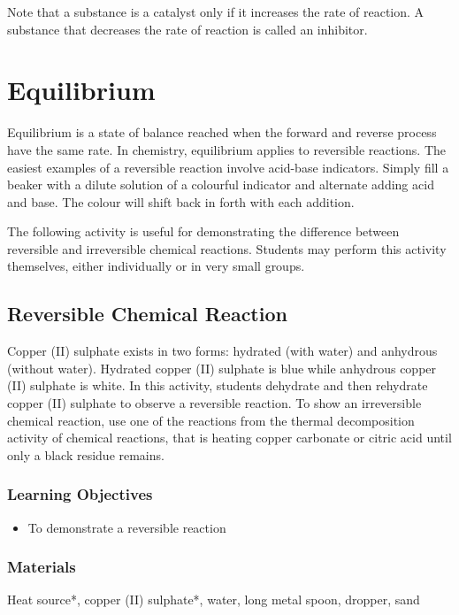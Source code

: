 Note that a substance is a catalyst only if it increases the rate of reaction. A substance that decreases the rate of reaction is called an inhibitor.

\section{Equilibrium}

Equilibrium is a state of balance reached when the forward and reverse process have the same rate. In chemistry, equilibrium applies to reversible reactions. The easiest examples of a reversible reaction involve acid-base indicators. Simply fill a beaker with a dilute solution of a colourful indicator and alternate adding acid and base. The colour will shift back in forth with each addition.

The following activity is useful for demonstrating the difference between reversible and irreversible chemical reactions. Students may perform this activity themselves, either individually or in very small groups.

\subsection{Reversible Chemical Reaction}

Copper (II) sulphate exists in two forms: hydrated (with water) and anhydrous (without water). Hydrated copper (II) sulphate is blue while anhydrous copper (II) sulphate is white. In this activity, students dehydrate and then rehydrate copper (II) sulphate to observe a reversible reaction. To show an irreversible chemical reaction, use one of the reactions from the thermal decomposition activity of chemical reactions, that is heating copper carbonate or citric acid until only a black residue remains.

\subsubsection*{Learning Objectives}
\begin{itemize}
\item{To demonstrate a reversible reaction}
\end{itemize}

\subsubsection*{Materials}
Heat source*, copper (II) sulphate*, water, long metal spoon, dropper, sand


